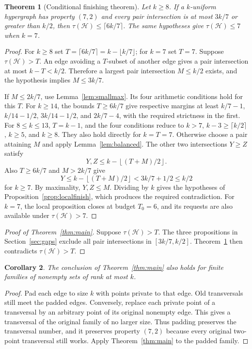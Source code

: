 \documentclass[11pt]{article}
\numberwithin{equation}{section}
\newtheorem{theorem}{Theorem}[section]
\newtheorem{corollary}[theorem]{Corollary}
\theoremstyle{definition}
\theoremstyle{remark}
\newcommand{\HH}{\mathcal H}
\newcommand{\floor}[1]{\left\lfloor #1\right\rfloor}
\begin{document}
\begin{theorem}[Conditional finishing theorem]\label{thm:finish}
Let $k\ge8$. If a $k$-uniform hypergraph has property $(7,2)$ and every
pair intersection is at most $3k/7$ or greater than $k/2$, then
$\tau(\HH)\le\lceil6k/7\rceil$. The same hypotheses give
$\tau(\HH)\le7$ when $k=7$.
\end{theorem}
\begin{proof}
For $k\ge8$ set $T=\lceil6k/7\rceil=k-\lfloor k/7\rfloor$;
for $k=7$ set $T=7$. Suppose $\tau(\HH)>T$.
An edge avoiding a $T$-subset of another edge gives a pair intersection
at most $k-T<k/2$. Therefore a largest pair intersection $M\le k/2$
exists, and the hypothesis implies $M\le3k/7$.

If $M\le2k/7$, use Lemma~\ref{lem:smallmax}. Its four arithmetic
conditions hold for this $T$. For $k\ge14$, the bounds $T\ge6k/7$
give respective margins at least $k/7-1$, $k/14-1/2$,
$3k/14-1/2$, and $2k/7-4$, with the required strictness in the first.
For $8\le k\le13$, $T=k-1$, and the four conditions reduce to
$k>7$, $k-3\ge\lceil k/2\rceil$, $k\ge5$, and $k\ge8$.
They also hold directly for $k=T=7$.
Otherwise choose a pair attaining $M$ and apply
Lemma~\ref{lem:balanced}. The other two intersections $Y\ge Z$ satisfy
\[
 Y,Z\le k-\floor{(T+M)/2}.
\]
Also $T\ge6k/7$ and $M>2k/7$ give
\[
 Y\le k-\floor{(T+M)/2}<3k/7+1/2\le k/2
\]
for $k\ge7$. By maximality, $Y,Z\le M$. Dividing by $k$ gives the hypotheses of
Proposition~\ref{prop:localfinish}, which produces the required
contradiction. For $k=7$, the local proposition closes at budget
$T_0=6$, and its requests are also available under $\tau(\HH)>7$.
\end{proof}

\begin{proof}[Proof of Theorem~\ref{thm:main}]
Suppose $\tau(\HH)>T$. The three propositions in
Section~\ref{sec:gaps} exclude all pair intersections in $[3k/7,k/2]$.
Theorem~\ref{thm:finish} then contradicts $\tau(\HH)>T$.
\end{proof}

\begin{corollary}
The conclusion of Theorem~\ref{thm:main} also holds for finite families
of nonempty sets of rank at most $k$.
\end{corollary}
\begin{proof}
Pad each edge to size $k$ with points private to that edge. Old
transversals still meet the padded edges. Conversely, replace each
private point of a transversal by an arbitrary point of its original
nonempty edge. This gives a transversal of the original family of no
larger size. Thus padding preserves the transversal number, and it
preserves property $(7,2)$ because every original two-point transversal
still works. Apply Theorem~\ref{thm:main} to the padded family.
\end{proof}
\end{document}

